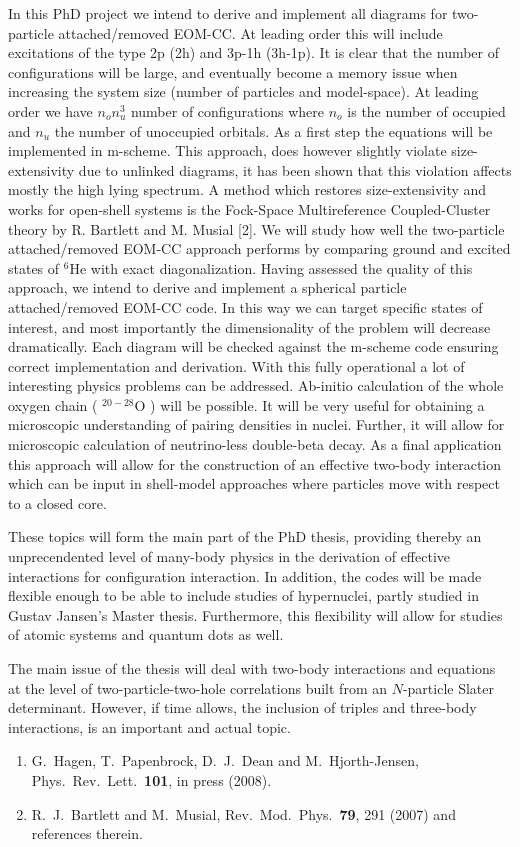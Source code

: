 \documentclass[prl,preprint]{revtex4}
\begin{document}
In this PhD project we intend to derive and implement all diagrams for 
two-particle attached/removed EOM-CC. At leading order this will
include excitations of the type 2p (2h) and 3p-1h (3h-1p). It is clear 
that the number of configurations will be large, and eventually become
a memory issue 
when increasing the system size (number of particles and
model-space). At leading order we have $n_{o}n_{u}^3$ number
of configurations where $n_{o}$ is the number of occupied and 
$n_{u}$ the number of unoccupied orbitals. As a first step the
equations will be implemented in m-scheme. This approach, does however
slightly violate size-extensivity due to unlinked diagrams, it has
been shown that this violation affects mostly the high lying
spectrum. A method which restores size-extensivity and works for
open-shell systems is the Fock-Space Multireference Coupled-Cluster
theory by R. Bartlett and M. Musial [2]. We will study how well the 
two-particle attached/removed EOM-CC approach performs by comparing 
ground and excited states of $^6$He with exact
diagonalization. Having assessed the quality of this approach, we
intend to derive and implement a spherical particle attached/removed
EOM-CC code. In this way we can target specific states of interest,
and most importantly the dimensionality of the problem will decrease
dramatically. Each diagram will be checked against the m-scheme code
ensuring correct implementation and derivation. With this 
fully operational a lot of interesting physics problems can be addressed.
Ab-initio calculation of the whole oxygen chain ( $^{20-28}$O ) will
be possible. It will be very useful for obtaining a
microscopic understanding of pairing densities in nuclei. Further, it
will allow for microscopic calculation of neutrino-less double-beta decay. 
As a final application this approach will allow for the construction
of an effective two-body interaction which can be input in shell-model
approaches where particles move with respect to a closed core. 


These topics will form the main part of the PhD thesis, providing thereby an unprecendented 
level of many-body physics in the derivation of effective interactions for configuration interaction. In addition, the codes will be made flexible enough
to be able to include studies of hypernuclei, partly studied in Gustav Jansen's Master thesis.
Furthermore, this flexibility will allow for studies of atomic systems and quantum dots as well.

The main issue of the thesis will deal with two-body interactions and equations at the level of 
two-particle-two-hole correlations built from an $N$-particle Slater determinant. However, if time allows, the inclusion of triples and three-body interactions, is an important and actual topic.


\begin{enumerate}
\item G.~Hagen, T.~Papenbrock, D.~J.~Dean and M.~Hjorth-Jensen, Phys.~Rev.~Lett.~{\bf 101}, in press (2008).
\item R.~J.~Bartlett and M.~Musial, Rev.~Mod.~Phys.~{\bf 79}, 291 (2007) and references therein.
\end{enumerate}
\end{document}
